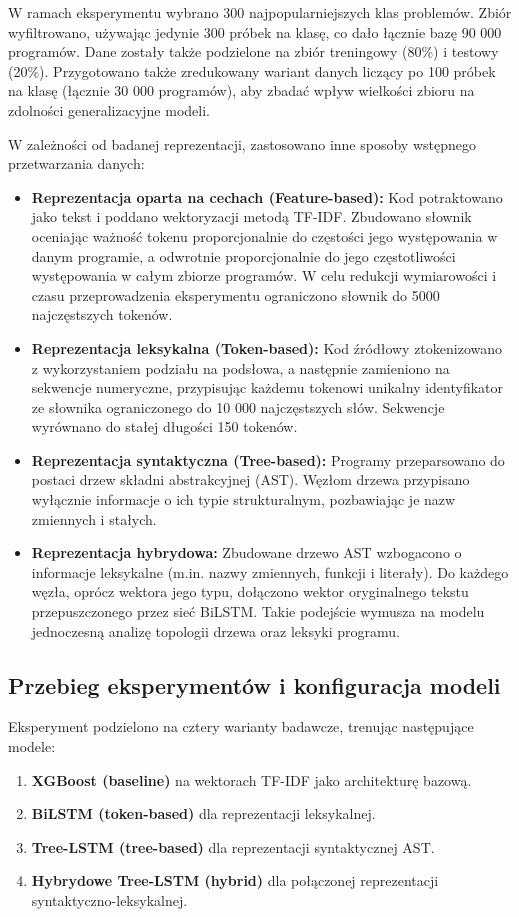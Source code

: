 \documentclass[conference]{IEEEtran}
\begin{document}
W ramach eksperymentu wybrano 300 najpopularniejszych klas problemów. Zbiór wyfiltrowano, 
używając jedynie 300 próbek na klasę, co dało łącznie bazę 90 000 programów. Dane zostały także podzielone na 
zbiór treningowy (80\%) i testowy (20\%). Przygotowano także zredukowany wariant danych liczący po 100 próbek 
na klasę (łącznie 30 000 programów), aby zbadać wpływ wielkości zbioru na zdolności generalizacyjne modeli.

W zależności od badanej reprezentacji, zastosowano inne sposoby wstępnego przetwarzania danych:
\begin{itemize}
    \item \textbf{Reprezentacja oparta na cechach (Feature-based):} Kod potraktowano jako tekst i poddano wektoryzacji metodą TF-IDF. Zbudowano słownik 
    oceniając ważność tokenu proporcjonalnie do częstości jego występowania w danym programie, a odwrotnie proporcjonalnie do jego częstotliwości występowania 
    w całym zbiorze programów. W celu redukcji wymiarowości i czasu przeprowadzenia eksperymentu ograniczono słownik do 5000 najczęstszych tokenów.
    \item \textbf{Reprezentacja leksykalna (Token-based):} Kod źródłowy ztokenizowano z wykorzystaniem podziału na podsłowa, a następnie zamieniono na 
    sekwencje numeryczne, przypisując każdemu tokenowi unikalny identyfikator ze słownika ograniczonego do 10 000 najczęstszych słów. Sekwencje wyrównano 
    do stałej długości 150 tokenów.
    \item \textbf{Reprezentacja syntaktyczna (Tree-based):} Programy przeparsowano do postaci drzew składni abstrakcyjnej (AST). Węzłom drzewa
    przypisano wyłącznie informacje o ich typie strukturalnym, pozbawiając je nazw zmiennych i stałych.
    \item \textbf{Reprezentacja hybrydowa:} Zbudowane drzewo AST wzbogacono o informacje leksykalne (m.in. nazwy zmiennych, funkcji i literały). 
    Do każdego węzła, oprócz wektora jego typu, dołączono wektor oryginalnego tekstu przepuszczonego przez sieć BiLSTM. 
    Takie podejście wymusza na modelu jednoczesną analizę topologii drzewa oraz leksyki programu.
\end{itemize}

\subsection{Przebieg eksperymentów i konfiguracja modeli}
Eksperyment podzielono na cztery warianty badawcze, trenując następujące modele:
\begin{enumerate}
    \item \textbf{XGBoost (baseline)} na wektorach TF-IDF jako architekturę bazową.
    \item \textbf{BiLSTM (token-based)} dla reprezentacji leksykalnej.
    \item \textbf{Tree-LSTM (tree-based)} dla reprezentacji syntaktycznej AST.
    \item \textbf{Hybrydowe Tree-LSTM (hybrid)} dla połączonej reprezentacji syntaktyczno-leksykalnej.
\end{enumerate}
\end{document}
